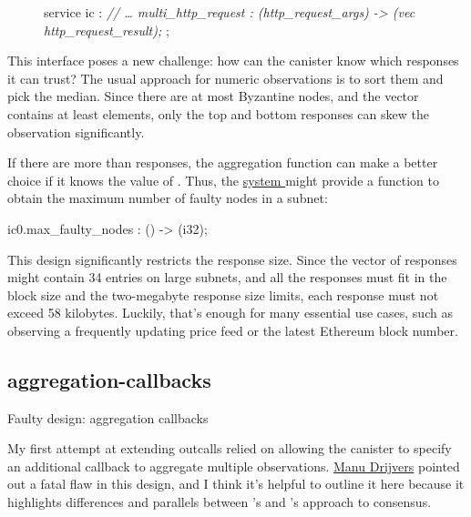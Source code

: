 \documentclass{article}
\begin{document}
\begin{figure}
\begin{code}[candid]
service ic : {
    \em{// \ldots}
    multi_http_request : (http_request_args) -> (vec http_request_result);
};
\end{code}
\end{figure}

This interface poses a new challenge: how can the canister know which responses it can trust?
The usual approach for numeric observations is to sort them and pick the median. 
Since there are at most  Byzantine nodes, and the  vector contains at least  elements, only the top and bottom  responses can skew the observation significantly.

If there are more than  responses, the aggregation function can make a better choice if it knows the value of .
Thus, the \href{https://internetcomputer.org/docs/current/references/ic-interface-spec/#system-api}{system } might provide a function to obtain the maximum number of faulty nodes in a subnet:

\begin{code}
ic0.max_faulty_nodes : () -> (i32);
\end{code}

This design significantly restricts the  response size.
Since the vector of responses might contain 34 entries on large subnets, and all the responses must fit in the block size and the two-megabyte response size limits, each response must not exceed 58 kilobytes.
Luckily, that's enough for many essential use cases, such as observing a frequently updating price feed or the latest Ethereum block number.

\subsection{aggregation-callbacks}{Faulty design: aggregation callbacks}

My first attempt at extending  outcalls relied on allowing the canister to specify an additional callback to aggregate multiple observations.
\href{https://manu.drijve.rs/}{Manu Drijvers} pointed out a fatal flaw in this design, and I think it's helpful to outline it here because it highlights differences and parallels between 's and 's approach to consensus.
\end{document}
